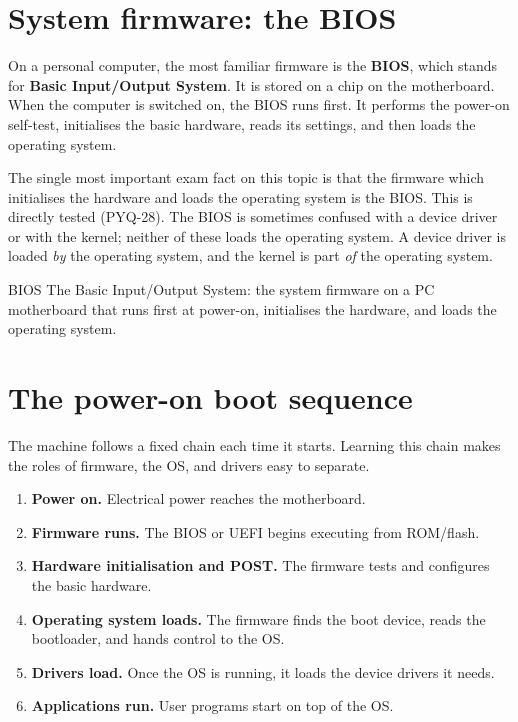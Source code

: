 \section{System firmware: the BIOS}
On a personal computer, the most familiar firmware is the \textbf{BIOS},
which stands for \textbf{Basic Input/Output System}. It is stored on a chip
on the motherboard. When the computer is switched on, the BIOS runs first. It
performs the power-on self-test, initialises the basic hardware, reads its
settings, and then loads the operating system.

The single most important exam fact on this topic is that the firmware which
initialises the hardware and loads the operating system is the BIOS. This is
directly tested (PYQ-28). The BIOS is sometimes confused with a device driver
or with the kernel; neither of these loads the operating system. A device
driver is loaded \emph{by} the operating system, and the kernel is part
\emph{of} the operating system.

\begin{definitionbox}{BIOS}
The Basic Input/Output System: the system firmware on a PC motherboard that
runs first at power-on, initialises the hardware, and loads the operating
system.
\end{definitionbox}

\section{The power-on boot sequence}
The machine follows a fixed chain each time it starts. Learning this chain
makes the roles of firmware, the OS, and drivers easy to separate.

\begin{enumerate}
  \item \textbf{Power on.} Electrical power reaches the motherboard.
  \item \textbf{Firmware runs.} The BIOS or UEFI begins executing from
    ROM/flash.
  \item \textbf{Hardware initialisation and POST.} The firmware tests and
    configures the basic hardware.
  \item \textbf{Operating system loads.} The firmware finds the boot device,
    reads the bootloader, and hands control to the OS.
  \item \textbf{Drivers load.} Once the OS is running, it loads the device
    drivers it needs.
  \item \textbf{Applications run.} User programs start on top of the OS.
\end{enumerate}

